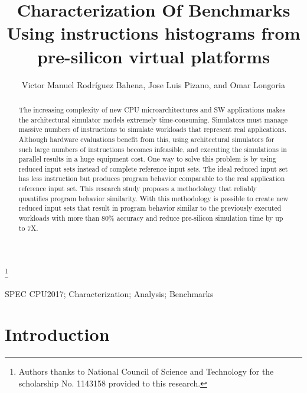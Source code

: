 \documentclass[]{PhDEngScITESO-R}
\begin{document}
	\title{Characterization Of Benchmarks Using instructions histograms from pre-silicon virtual platforms }
	
	\author{Victor Manuel Rodr\'{i}guez Bahena, Jose Luis Pizano, and Omar Longoria} 
	
	\thanks{Authors thanks to National Council of Science and Technology for the
	scholarship No. 1143158 provided to this research.}
	
	\maketitle
	\begin{IEEEkeywords}
	SPEC CPU2017;  Characterization;  Analysis; Benchmarks
	\end{IEEEkeywords}


\begin{abstract}

The increasing complexity of  new CPU microarchitectures and SW applications makes the architectural simulator models extremely time-consuming. Simulators must manage massive numbers of instructions to simulate workloads that represent real applications. Although hardware evaluations benefit from this, using architectural simulators for such large numbers of instructions becomes infeasible, and executing the simulations in parallel results in a huge equipment cost. One way to solve this problem is by using reduced input sets instead of complete reference input sets. The ideal reduced input set has less instruction but produces program behavior comparable to the real application reference input set. This research study proposes a methodology that reliably quantifies program behavior similarity. With this methodology is possible to create new reduced input sets that result in program behavior similar to the previously executed workloads with more than 80\% accuracy and reduce pre-silicon simulation time by up to 7X. 

\end{abstract}
	
\section{Introduction}
\end{document}

